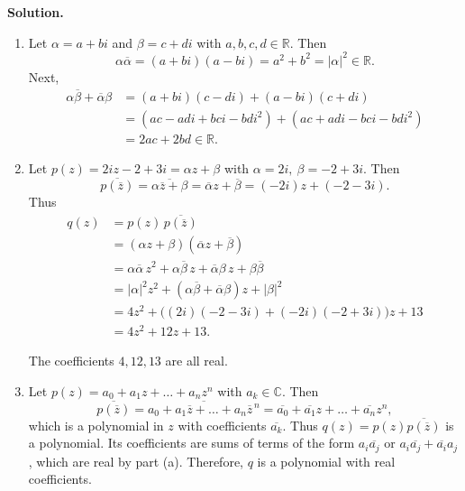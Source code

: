 \documentclass[11pt]{article}
\newcommand{\SolutionAnnounce}{\noindent\textbf{Solution.}\par\medskip}
\newcommand{\R}{\mathbb{R}}
\newcommand{\C}{\mathbb{C}}
\begin{document}
\begin{solutionBox}
\SolutionAnnounce
\doublespacing

\begin{enumerate}
  \item[(a)] Let \(\alpha = a + bi\) and \(\beta = c + di\) with \(a,b,c,d \in \R\). Then
  \[
  \alpha \overline{\alpha} = (a+bi)(a-bi) = a^{2} + b^{2} = |\alpha|^{2} \in \R.
  \]
  Next,
  \begin{align*}
  \alpha \overline{\beta} + \overline{\alpha} \beta
  &= (a+bi)(c-di) + (a-bi)(c+di) \\
  &= (ac - adi + bci - bdi^{2}) + (ac + adi - bci - bdi^{2}) \\
  &= 2ac + 2bd \in \R.
  \end{align*}

  \item[(b)] Let \(p(z) = 2iz - 2 + 3i = \alpha z + \beta\) with \(\alpha = 2i,\ \beta = -2 + 3i\). Then
  \[
  \overline{p(\overline{z})} = \overline{\alpha \overline{z} + \beta}
  = \overline{\alpha} z + \overline{\beta}
  = (-2i)z + (-2 - 3i).
  \]
  Thus
  \begin{align*}
q(z) &= p(z)\,\overline{p(\overline{z})} \\
     &= (\alpha z + \beta)(\overline{\alpha} z + \overline{\beta}) \\
     &= \alpha\overline{\alpha}\, z^2 + \alpha\overline{\beta}\, z + \overline{\alpha}\beta\, z + \beta\overline{\beta} \\
     &= |\alpha|^2 z^2 + (\alpha\overline{\beta} + \overline{\alpha}\beta)z + |\beta|^2 \\
     &= 4z^2 + \big( (2i)(-2-3i) + (-2i)(-2+3i) \big) z + 13 \\
     &= 4z^2 + 12z + 13.
\end{align*}

  The coefficients \(4, 12, 13\) are all real.

  \item[(c)] Let \(p(z) = a_{0} + a_{1}z + \dots + a_{n}z^{n}\) with \(a_{k} \in \C\). Then
  \[
  \overline{p(\overline{z})}
  = \overline{a_{0} + a_{1}\overline{z} + \dots + a_{n}\overline{z}^{\,n}}
  = \overline{a_{0}} + \overline{a_{1}} z + \dots + \overline{a_{n}} z^{n},
  \]
  which is a polynomial in \(z\) with coefficients \(\overline{a_{k}}\). Thus \(q(z) = p(z)\overline{p(\overline{z})}\) is a polynomial. Its coefficients are sums of terms of the form \(a_{i}\overline{a_{j}}\) or \(a_{i}\overline{a_{j}} + \overline{a_{i}}a_{j}\), which are real by part (a). Therefore, \(q\) is a polynomial with real coefficients.
\end{enumerate}

\end{solutionBox}
\end{document}
